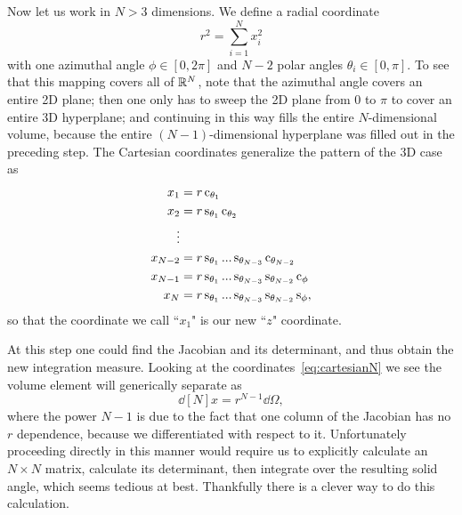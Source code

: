 Now let us work in $N>3$ dimensions. We define a radial coordinate
\begin{equation}
  r^2=\sum_{i=1}^N x_i^2
\end{equation}
with one azimuthal angle $\phi\in[0,2\pi]$ and $N-2$ polar angles 
$\theta_i\in[0,\pi]$. To see that this mapping covers all of $\mathbb{R}^N$,
note that the azimuthal angle covers an entire 2D plane; then one
only has to sweep the 2D plane from 0 to $\pi$ to cover an entire
3D hyperplane; and continuing in this way fills the entire $N$-dimensional 
volume, because the entire $(N-1)$-dimensional hyperplane was filled out in 
the preceding step. The Cartesian coordinates generalize the pattern
of the 3D case as 
\begin{equation}\label{eq:cartesianN}
  \begin{aligned}
        x_1&=r\operatorname{c}_{\theta_1}\\
        x_2&=r\operatorname{s}_{\theta_1}\operatorname{c}_{\theta_2}\\
     \vdots&\\
    x_{N-2}&=r\operatorname{s}_{\theta_1}...\operatorname{s}_{\theta_{N-3}}\operatorname{c}_{\theta_{N-2}}\\
    x_{N-1}&=r\operatorname{s}_{\theta_1}...\operatorname{s}_{\theta_{N-3}}\operatorname{s}_{\theta_{N-2}}\operatorname{c}_\phi\\
        x_N&=r\operatorname{s}_{\theta_1}...\operatorname{s}_{\theta_{N-3}}\operatorname{s}_{\theta_{N-2}}\operatorname{s}_\phi,
  \end{aligned}
\end{equation}
so that the coordinate we call ``$x_1$" is our new ``$z$" coordinate.

At this step one could find the Jacobian and its determinant, and thus obtain
the new integration measure. Looking at the coordinates~\eqref{eq:cartesianN}
we see the volume element will generically separate as
\begin{equation}
  \dd[N]{x}=r^{N-1}\dd{\Omega},
\end{equation}
where the power $N-1$ is due to the fact that one column of the Jacobian has no
$r$ dependence, because we differentiated with respect to it. Unfortunately
proceeding directly in this manner would require us to explicitly calculate an
$N\times N$ matrix, calculate its determinant, then integrate over the
resulting solid angle, which seems tedious at best.
Thankfully there is a clever way to do this calculation. 

